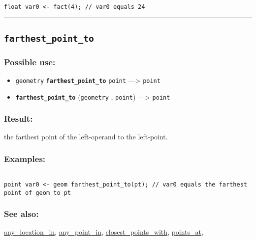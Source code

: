 \documentclass[]{book}
\providecommand{\tightlist}{%
  \setlength{\itemsep}{0pt}\setlength{\parskip}{0pt}}
\theoremstyle{definition}
\theoremstyle{definition}
\theoremstyle{definition}
\theoremstyle{remark}
\begin{document}
\begin{verbatim}
 
float var0 <- fact(4); // var0 equals 24
\end{verbatim}

\begin{center}\rule{0.5\linewidth}{\linethickness}\end{center}

\subsection{\texorpdfstring{\texttt{farthest\_point\_to}}{farthest\_point\_to}}\label{farthest_point_to}

\subsubsection{Possible use:}\label{possible-use-162}

\begin{itemize}
\tightlist
\item
  \texttt{geometry} \textbf{\texttt{farthest\_point\_to}} \texttt{point}
  ---\textgreater{} \texttt{point}
\item
  \textbf{\texttt{farthest\_point\_to}} (\texttt{geometry} ,
  \texttt{point}) ---\textgreater{} \texttt{point}
\end{itemize}

\subsubsection{Result:}\label{result-156}

the farthest point of the left-operand to the left-point.

\subsubsection{Examples:}\label{examples-121}

\begin{verbatim}
 
point var0 <- geom farthest_point_to(pt); // var0 equals the farthest point of geom to pt
\end{verbatim}

\subsubsection{See also:}\label{see-also-91}

\href{OperatorsAA\#any_location_in}{any\_location\_in},
\href{OperatorsAA\#any_point_in}{any\_point\_in},
\href{OperatorsBC\#closest_points_with}{closest\_points\_with},
\href{OperatorsNR\#points_at}{points\_at},
\end{document}
